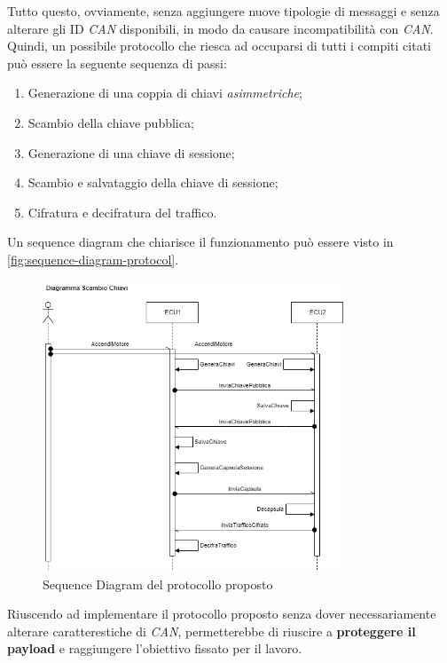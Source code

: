 Tutto questo, ovviamente, senza aggiungere nuove tipologie di messaggi e senza alterare gli ID \emph{CAN} disponibili, in modo da causare incompatibilità con \emph{CAN}. Quindi, un possibile protocollo che riesca ad occuparsi di tutti i compiti citati può essere la seguente sequenza di passi:
\begin{enumerate}
    \item Generazione di una coppia di chiavi \emph{asimmetriche};
    \item Scambio della chiave pubblica;
    \item Generazione di una chiave di sessione;
    \item Scambio e salvataggio della chiave di sessione;
    \item Cifratura e decifratura del traffico.
\end{enumerate}

Un sequence diagram che chiarisce il funzionamento può essere visto in \autoref{fig:sequence-diagram-protocol}.
\begin{figure}[h]
    \centering
    \includegraphics[width=0.8\textwidth]{capitoli/figure-soluzione-proposta/sequence-key-exchange.png}
    \caption{Sequence Diagram del protocollo proposto}
    \label{fig:sequence-diagram-protocol}
\end{figure}

Riuscendo ad implementare il protocollo proposto senza dover necessariamente alterare caratterestiche di \emph{CAN}, permetterebbe di riuscire a \textbf{proteggere il payload} e raggiungere l'obiettivo fissato per il lavoro.